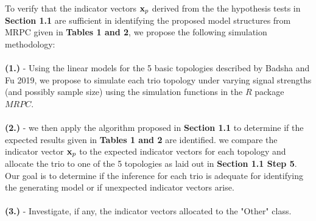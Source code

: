 \documentclass[12pt]{report}
\begin{document}
To verify that the indicator vectors ${\bf x}_p$ derived from the the hypothesis tests in \textbf{Section 1.1} are sufficient in identifying the proposed model structures from MRPC given in \textbf{Tables 1 and 2}, we propose the following simulation methodology: \\
\\

\noindent \textbf{(1.)} - Using the linear models for the 5 basic topologies described by Badsha and Fu 2019, we propose to simulate each trio topology under varying signal strengths (and possibly sample size) using the simulation functions in the $R$ package $MRPC$.\\
\\
\noindent \textbf{(2.)}  - we then apply the algorithm proposed in \textbf{Section 1.1} to determine if the expected results given in \textbf{ Tables 1 and 2} are identified. we compare the indicator vector ${\bf x}_p$ to the expected indicator vectors for each topology and allocate the trio to one of the 5 topologies as laid out in \textbf{Section 1.1 Step 5}. Our goal is to determine if the inference for each trio is adequate for identifying the generating model or if unexpected indicator vectors arise. \\
\\
\textbf{(3.)} - Investigate, if any, the indicator vectors allocated to the "Other" class. 





\newpage
\end{document}
